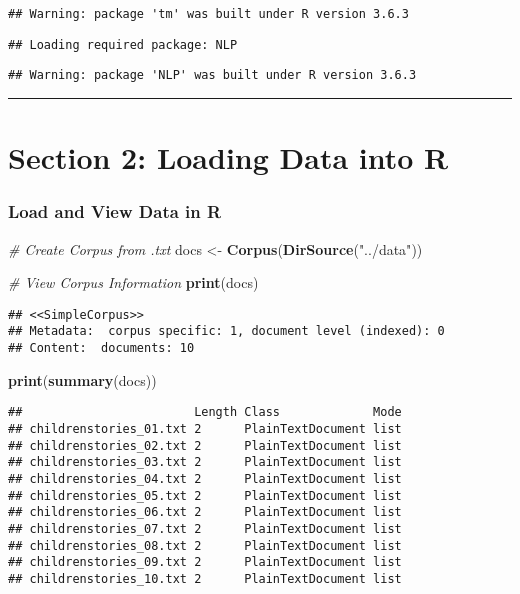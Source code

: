\documentclass[
]{article}
\newenvironment{Shaded}{\begin{snugshade}}{\end{snugshade}}
\newcommand{\CommentTok}[1]{\textcolor[rgb]{0.56,0.35,0.01}{\textit{#1}}}
\newcommand{\KeywordTok}[1]{\textcolor[rgb]{0.13,0.29,0.53}{\textbf{#1}}}
\newcommand{\NormalTok}[1]{#1}
\newcommand{\StringTok}[1]{\textcolor[rgb]{0.31,0.60,0.02}{#1}}
\begin{document}
\begin{verbatim}
## Warning: package 'tm' was built under R version 3.6.3
\end{verbatim}

\begin{verbatim}
## Loading required package: NLP
\end{verbatim}

\begin{verbatim}
## Warning: package 'NLP' was built under R version 3.6.3
\end{verbatim}

\begin{center}\rule{0.5\linewidth}{0.5pt}\end{center}

\hypertarget{section-2-loading-data-into-r}{%
\section{Section 2: Loading Data into
R}\label{section-2-loading-data-into-r}}

\hypertarget{load-and-view-data-in-r}{%
\subsubsection{Load and View Data in R}\label{load-and-view-data-in-r}}

\begin{Shaded}
\begin{Highlighting}[]
\CommentTok{# Create Corpus from .txt}
\NormalTok{docs <-}\StringTok{ }\KeywordTok{Corpus}\NormalTok{(}\KeywordTok{DirSource}\NormalTok{(}\StringTok{"../data"}\NormalTok{))}

\CommentTok{# View Corpus Information}
\KeywordTok{print}\NormalTok{(docs)}
\end{Highlighting}
\end{Shaded}

\begin{verbatim}
## <<SimpleCorpus>>
## Metadata:  corpus specific: 1, document level (indexed): 0
## Content:  documents: 10
\end{verbatim}

\begin{Shaded}
\begin{Highlighting}[]
\KeywordTok{print}\NormalTok{(}\KeywordTok{summary}\NormalTok{(docs))}
\end{Highlighting}
\end{Shaded}

\begin{verbatim}
##                        Length Class             Mode
## childrenstories_01.txt 2      PlainTextDocument list
## childrenstories_02.txt 2      PlainTextDocument list
## childrenstories_03.txt 2      PlainTextDocument list
## childrenstories_04.txt 2      PlainTextDocument list
## childrenstories_05.txt 2      PlainTextDocument list
## childrenstories_06.txt 2      PlainTextDocument list
## childrenstories_07.txt 2      PlainTextDocument list
## childrenstories_08.txt 2      PlainTextDocument list
## childrenstories_09.txt 2      PlainTextDocument list
## childrenstories_10.txt 2      PlainTextDocument list
\end{verbatim}
\end{document}
